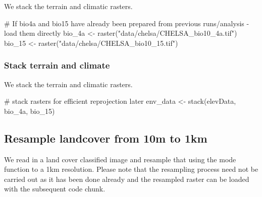 \documentclass[
]{article}
\newenvironment{Shaded}{}{}
\newcommand{\CommentTok}[1]{\textcolor[rgb]{0.00,0.50,0.00}{#1}}
\newcommand{\DecValTok}[1]{#1}
\newcommand{\KeywordTok}[1]{\textcolor[rgb]{0.00,0.00,1.00}{#1}}
\newcommand{\NormalTok}[1]{#1}
\newcommand{\StringTok}[1]{\textcolor[rgb]{0.00,0.50,0.50}{#1}}
\begin{document}
We stack the terrain and climatic rasters.

\begin{Shaded}
\begin{Highlighting}[]
\CommentTok{# If bio4a and bio15 have already been prepared from previous runs/analysis - load them directly}
\NormalTok{bio_4a <-}\StringTok{ }\KeywordTok{raster}\NormalTok{(}\StringTok{"data/chelsa/CHELSA_bio10_4a.tif"}\NormalTok{)}
\NormalTok{bio_}\DecValTok{15}\NormalTok{ <-}\StringTok{ }\KeywordTok{raster}\NormalTok{(}\StringTok{"data/chelsa/CHELSA_bio10_15.tif"}\NormalTok{)}
\end{Highlighting}
\end{Shaded}

\hypertarget{stack-terrain-and-climate-1}{%
\subsubsection{Stack terrain and climate}\label{stack-terrain-and-climate-1}}

We stack the terrain and climatic rasters.

\begin{Shaded}
\begin{Highlighting}[]
\CommentTok{# stack rasters for efficient reprojection later}
\NormalTok{env_data <-}\StringTok{ }\KeywordTok{stack}\NormalTok{(elevData, bio_4a, bio_}\DecValTok{15}\NormalTok{)}
\end{Highlighting}
\end{Shaded}

\hypertarget{resample-landcover-from-10m-to-1km}{%
\subsection{Resample landcover from 10m to 1km}\label{resample-landcover-from-10m-to-1km}}

We read in a land cover classified image and resample that using the mode function to a 1km resolution. Please note that the resampling process need not be carried out as it has been done already and the resampled raster can be loaded with the subsequent code chunk.
\end{document}
